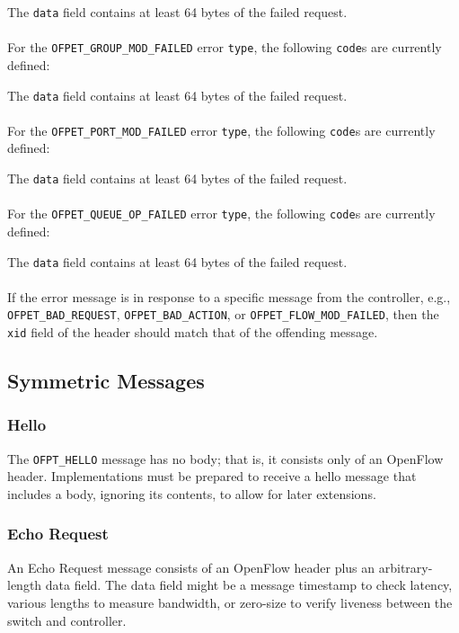 
The \verb|data| field contains at least 64 bytes of the failed request.
\\\\
For the \verb|OFPET_GROUP_MOD_FAILED| error \verb|type|, the following \verb|code|s are currently defined:


The \verb|data| field contains at least 64 bytes of the failed request.
\\\\
For the \verb|OFPET_PORT_MOD_FAILED| error \verb|type|, the following \verb|code|s are currently defined:


The \verb|data| field contains at least 64 bytes of the failed request.
\\\\
For the \verb|OFPET_QUEUE_OP_FAILED| error \verb|type|, the following \verb|code|s are currently defined:


The \verb|data| field contains at least 64 bytes of the failed request.
\\\\
If the error message is in response to a specific message from the controller, e.g., \verb|OFPET_BAD_REQUEST|, \verb|OFPET_BAD_ACTION|, or \verb|OFPET_FLOW_MOD_FAILED|, then the \verb|xid| field of the header should match that of the offending message.

\subsection{Symmetric Messages}
\subsubsection{Hello}
The \verb|OFPT_HELLO| message has no body; that is, it consists only of an OpenFlow header. Implementations must be prepared to receive a hello message that includes a body, ignoring its contents, to allow for later extensions. 

\subsubsection{Echo Request}
An Echo Request message consists of an OpenFlow header plus an arbitrary-length data field.  The data field might be a message timestamp to check latency, various lengths to measure bandwidth, or zero-size to verify liveness between the switch and controller.

